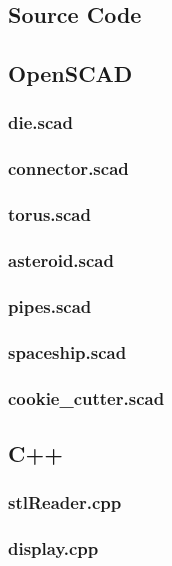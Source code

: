 \documentclass[12pt]{article}
\begin{document}
\begin{onehalfspace}
\section{Source Code}
\subsection{OpenSCAD}
\subsubsection{die.scad}

\subsubsection{connector.scad}

\subsubsection{torus.scad}

\subsubsection{asteroid.scad}

\subsubsection{pipes.scad}

\subsubsection{spaceship.scad}

\subsubsection{cookie\_cutter.scad}


\subsection{C++}
\subsubsection{stlReader.cpp}

\subsubsection{display.cpp}


\end{onehalfspace}
\end{document}
